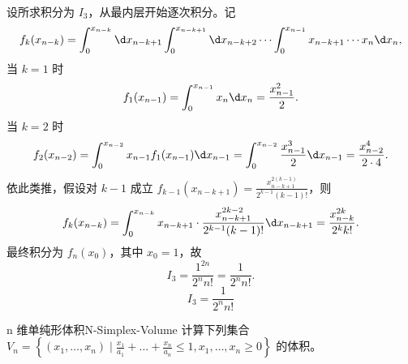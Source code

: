 \begin{solution}

    设所求积分为 $I_3$，从最内层开始逐次积分。记
    \begin{equation}
        f_k(x_{n-k}) = \int_0^{x_{n-k}} \d x_{n-k+1} \int_0^{x_{n-k+1}} \d x_{n-k+2} \cdots \int_0^{x_{n-1}} x_{n-k+1} \cdots x_n \d x_n,
    \end{equation}
    当 $k=1$ 时
    \begin{equation}
        f_1(x_{n-1}) = \int_0^{x_{n-1}} x_n \d x_n = \frac{x_{n-1}^2}{2}.
    \end{equation}
    当 $k=2$ 时
    \begin{equation}
        f_2(x_{n-2}) = \int_0^{x_{n-2}} x_{n-1} f_1(x_{n-1}) \d x_{n-1} = \int_0^{x_{n-2}} \frac{x_{n-1}^3}{2} \d x_{n-1} = \frac{x_{n-2}^4}{2 \cdot 4}.
    \end{equation}
    依此类推，假设对 $k-1$ 成立 $f_{k-1}(x_{n-k+1}) = \frac{x_{n-k+1}^{2(k-1)}}{2^{k-1} (k-1)!}$，则
    \begin{equation}
        f_k(x_{n-k}) = \int_0^{x_{n-k}} x_{n-k+1} \cdot \frac{x_{n-k+1}^{2k-2}}{2^{k-1} (k-1)!} \d x_{n-k+1} = \frac{x_{n-k}^{2k}}{2^k k!}.
    \end{equation}
    最终积分为 $f_n(x_0)$，其中 $x_0 = 1$，故
    \begin{equation}
        I_3 = \frac{1^{2n}}{2^n n!} = \frac{1}{2^n n!}.
    \end{equation}
    \begin{equation}
        \boxed{I_3 = \frac{1}{2^n n!}}
    \end{equation}
\end{solution}

\begin{problem}{n 维单纯形体积}{N-Simplex-Volume}
    计算下列集合 $V_n = \left\{ (x_1, \dots, x_n) \mid \frac{x_1}{a_1} + \dots + \frac{x_n}{a_n} \leqslant 1, x_1, \dots, x_n \geqslant 0 \right\}$ 的体积。
\end{problem}

